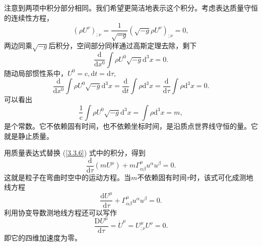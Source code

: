 \documentclass[11pt, a4paper, oneside, onecolumn]{ctexart}
\numberwithin{equation}{subsection}
\begin{document}
注意到两项中积分部分相同。我们希望更简洁地表示这个积分。考虑表达质量守恒的连续性方程，
\begin{equation}
\left(\rho U^{\nu}\right)_{;\nu}=\frac{1}{\sqrt{-g}}\left(\sqrt{-g}\rho U^{\nu}\right)_{;\nu}=0,
\end{equation}
两边同乘$\sqrt{-g}$后积分，空间部分同样通过高斯定理去除，剩下
\begin{equation}
\frac{\mathrm{d}}{\mathrm{d}x^{0}}\int\rho U^{0}\sqrt{-g}\mathrm{d}^{3}x=0.
\end{equation}
随动局部惯性系中，$U^{0}=\mathrm{c},\mathrm{d}t=\mathrm{d}\tau$,
\begin{equation}
\frac{\mathrm{d}}{\mathrm{d}x^{0}}\int\rho U^{0}\sqrt{-g}\mathrm{d}^{3}x=\frac{\mathrm{d}}{\mathrm{d}t}\int\rho\mathrm{d}^{3}x=\frac{\mathrm{d}}{\mathrm{d}\tau}\int\rho\mathrm{d}^{3}x=0.
\end{equation}
可以看出
\begin{equation}
\frac{1}{\mathrm{c}}\int\rho U^{0}\sqrt{-g}\mathrm{d}^{3}x=\int\rho\mathrm{d}^{3}x=m,
\end{equation}
是个常数。它不依赖固有时间，也不依赖坐标时间，是沿质点世界线守恒的量。它就是静止质量。

用质量表达式替换 (\ref{3.3.6}) 式中的积分，得到
\begin{equation}
\frac{\mathrm{d}}{\mathrm{d}\tau}\left(mU^{\mu}\right)+m\Gamma_{\alpha\beta}^{\mu}u^{\alpha}u^{\beta}=0.\label{3.3.11}
\end{equation}
这就是粒子在弯曲时空中的运动方程。当$m$不依赖固有时间$\tau$时，该式可化成测地线方程
\begin{equation}
\frac{\mathrm{d}U^{\mu}}{\mathrm{d}\tau}+\Gamma_{\alpha\beta}^{\mu}u^{\alpha}u^{\beta}=0.
\end{equation}
利用协变导数测地线方程还可以写作
\begin{equation}
\dfrac{\mathrm{D}U^{\mu}}{\mathrm{d}\tau}=\dot{U}^{\mu}=U^{\mu}_{;\nu}U^{\nu}=0.\label{3.3.13}
\end{equation}
即它的四维加速度为零。
\end{document}
